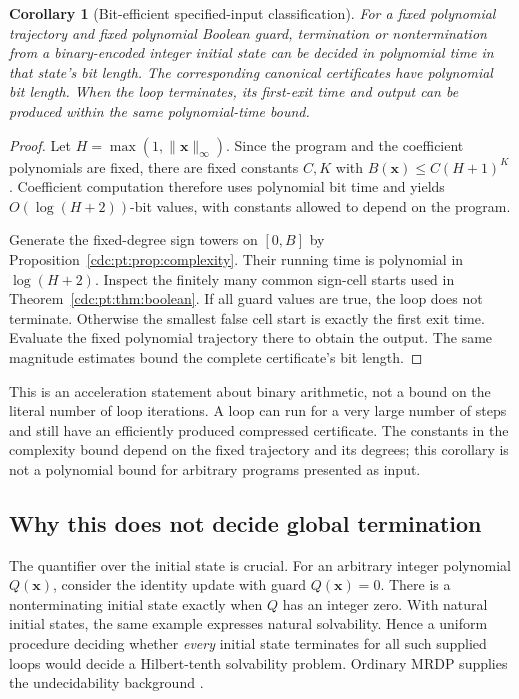 \documentclass[11pt,a4paper]{article}
\newtheorem{corollary}[corollary]{Corollary}
\theoremstyle{definition}
\theoremstyle{remark}
\begin{document}
\begin{corollary}[Bit-efficient specified-input classification]
\label{cdc:pt:cor:input-complexity}
For a fixed polynomial trajectory and fixed polynomial Boolean guard,
termination or nontermination from a binary-encoded integer initial state
can be decided in polynomial time in that state's bit length. The
corresponding canonical certificates have polynomial bit length. When the
loop terminates, its first-exit time and output can be produced within the
same polynomial-time bound.
\end{corollary}
\begin{proof}
Let $H=\max(1,\|\boldsymbol x\|_\infty)$. Since the program and the
coefficient polynomials are fixed, there are fixed constants $C,K$ with
$B(\boldsymbol x)\leq C(H+1)^K$. Coefficient computation therefore uses
polynomial bit time and yields $O(\log(H+2))$-bit values, with constants
allowed to depend on the program.

Generate the fixed-degree sign towers on $[0,B]$ by
Proposition~\ref{cdc:pt:prop:complexity}. Their running time is polynomial in
$\log(H+2)$. Inspect the finitely many common sign-cell starts used in
Theorem~\ref{cdc:pt:thm:boolean}. If all guard values are true, the loop does not
terminate. Otherwise the smallest false cell start is exactly the first
exit time. Evaluate the fixed polynomial trajectory there to obtain the
output. The same magnitude estimates bound the complete certificate's
bit length.
\end{proof}

This is an acceleration statement about binary arithmetic, not a bound on
the literal number of loop iterations. A loop can run for a very large
number of steps and still have an efficiently produced compressed
certificate. The constants in the complexity bound depend on the fixed
trajectory and its degrees; this corollary is not a polynomial bound for
arbitrary programs presented as input.

\subsection{Why this does not decide global termination}
The quantifier over the initial state is crucial. For an arbitrary integer
polynomial $Q(\boldsymbol x)$, consider the identity update with guard
$Q(\boldsymbol x)=0$. There is a nonterminating initial state exactly when
$Q$ has an integer zero. With natural initial states, the same example
expresses natural solvability. Hence a uniform procedure deciding whether
\emph{every} initial state terminates for all such supplied loops would
decide a Hilbert-tenth solvability problem. Ordinary MRDP supplies the
undecidability background \cite{lf2022}.
\end{document}
